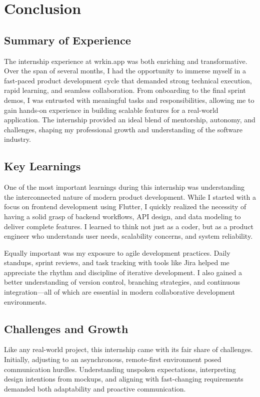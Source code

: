 \chapter{Conclusion}

\section{Summary of Experience}

The internship experience at wrkin.app was both enriching and transformative. Over the span of several months, I had the opportunity to immerse myself in a fast-paced product development cycle that demanded strong technical execution, rapid learning, and seamless collaboration. From onboarding to the final sprint demos, I was entrusted with meaningful tasks and responsibilities, allowing me to gain hands-on experience in building scalable features for a real-world application. The internship provided an ideal blend of mentorship, autonomy, and challenges, shaping my professional growth and understanding of the software industry.

\section{Key Learnings}

One of the most important learnings during this internship was understanding the interconnected nature of modern product development. While I started with a focus on frontend development using Flutter, I quickly realized the necessity of having a solid grasp of backend workflows, API design, and data modeling to deliver complete features. I learned to think not just as a coder, but as a product engineer who understands user needs, scalability concerns, and system reliability.

Equally important was my exposure to agile development practices. Daily standups, sprint reviews, and task tracking with tools like Jira helped me appreciate the rhythm and discipline of iterative development. I also gained a better understanding of version control, branching strategies, and continuous integration—all of which are essential in modern collaborative development environments.

\section{Challenges and Growth}

Like any real-world project, this internship came with its fair share of challenges. Initially, adjusting to an asynchronous, remote-first environment posed communication hurdles. Understanding unspoken expectations, interpreting design intentions from mockups, and aligning with fast-changing requirements demanded both adaptability and proactive communication.

